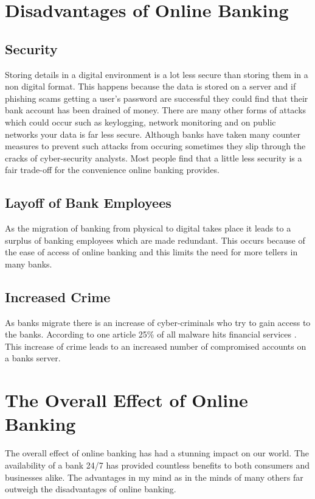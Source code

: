 \section{Disadvantages of Online Banking}
\subsection{Security}
Storing details in a digital environment is a lot less secure than storing them
in a non digital format.  This happens because the data is stored on a server
and if phishing scams getting a user's password are successful they could find that
their bank account has been drained of money.  There are many other forms of attacks
which could occur such as keylogging, network monitoring and on public networks
your data is far less secure.  Although banks have taken many counter measures
to prevent such attacks from occuring sometimes they slip through the cracks of
cyber-security analysts\cite{BankHacks}.  Most people find that a little less security is a fair
trade-off for the convenience online banking provides.
\subsection{Layoff of Bank Employees}
As the migration of banking from physical to digital takes place it leads to
a surplus of banking employees which are made redundant.  This occurs because
of the ease of access of online banking and this limits the need for more
tellers in many banks.
\subsection{Increased Crime}
As banks migrate there is an increase of cyber-criminals who try to gain access
to the banks.  According to one article 25\% of all malware hits financial services
\cite{ForbesBankHack}.  This increase of crime leads to an increased number of compromised
accounts on a banks server.
\section{The Overall Effect of Online Banking}
The overall effect of online banking has had a stunning impact on our world.
The availability of a bank 24/7 has provided countless benefits to both consumers
and businesses alike.  The advantages in my mind as in the minds of many others
far outweigh the disadvantages of online banking.
